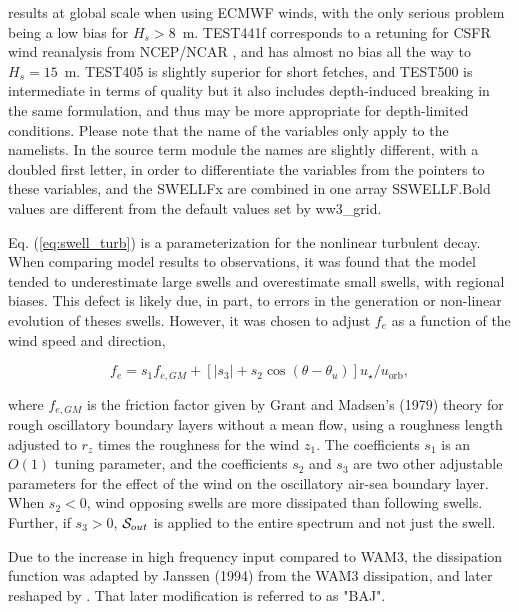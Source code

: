 \begin{landscape}
\begin{table}
{results at global scale when using ECMWF winds, with the only serious problem being a low bias for $H_s > 8$~m. 
TEST441f corresponds to a retuning for CSFR wind reanalysis from NCEP/NCAR \citep{art:CFSR10}, and 
has almost no bias all the way to $H_s = 15$~m.
TEST405 
is slightly superior for short fetches, and TEST500 is intermediate in terms of quality 
but it also includes depth-induced breaking in the same formulation, 
and thus may be more appropriate for depth-limited conditions.
 Please
note that the name of the variables only apply to the namelists. In the source
term module the names are slightly different, with a doubled first letter, in
order to differentiate the variables from the pointers to these variables, and
the SWELLFx are combined in one array SSWELLF.Bold values are different from the 
default values set by ww3\_grid.} \label{tab:ST4_parSIN}
\end{table}
\end{landscape}



Eq. (\ref{eq:swell_turb}) is a parameterization for the
nonlinear turbulent decay. When comparing model results to observations, it
was found that the model tended to underestimate large swells and overestimate
small swells, with regional biases. This defect is likely due, in part, to
errors in the generation or non-linear evolution of theses swells. However, it
was chosen to adjust $f_e$ as a function of the wind speed and direction,

\begin{equation}
f_e = s_1 f_{e,GM} + \left[\left|s_3\right| + s_2 \cos
(\theta-\theta_u)\right]u_\star / u_{\mathrm{orb}},\label{fevar}
\end{equation}

\noindent
where $f_{e,GM}$ is the friction factor given by Grant and Madsen's
(1979)\nocite{art:GM79} theory for rough oscillatory boundary layers without a
mean flow, using a roughness length adjusted to $r_z$ times the roughness for
the wind $z_1$. The coefficients $s_1$ is an $O(1)$ tuning parameter, and the
coefficients $s_2$ and $s_3$ are two other adjustable parameters for the
effect of the wind on the oscillatory air-sea boundary layer. When $s_2 < 0$,
wind opposing swells are more dissipated than following swells. Further, if
$s_3 > 0$, ${\cal S}_{out}$ is applied to the entire spectrum and not just the
swell.

Due to the increase in high frequency input compared to WAM3, the dissipation
function was adapted by Janssen (1994) from the WAM3 dissipation, and later
reshaped by \cite{rep:Bea05}. That later modification is referred to as "BAJ".


